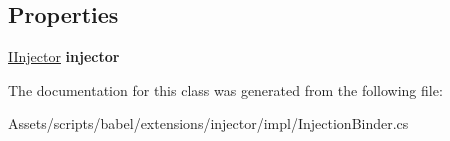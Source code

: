 \subsection*{Properties}
\begin{DoxyCompactItemize}
\item 
\hypertarget{classbabel_1_1extensions_1_1injector_1_1impl_1_1_injection_binder_aae007354ff0055260f55237c372a54f5}{\hyperlink{interfacebabel_1_1extensions_1_1injector_1_1api_1_1_i_injector}{I\-Injector} {\bfseries injector}}\label{classbabel_1_1extensions_1_1injector_1_1impl_1_1_injection_binder_aae007354ff0055260f55237c372a54f5}

\end{DoxyCompactItemize}


The documentation for this class was generated from the following file\-:\begin{DoxyCompactItemize}
\item 
Assets/scripts/babel/extensions/injector/impl/Injection\-Binder.\-cs\end{DoxyCompactItemize}
